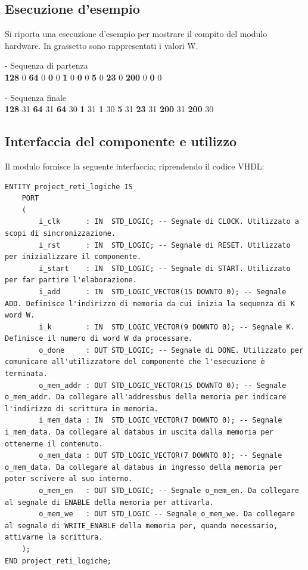 \documentclass[a4paper]{article}
\begin{document}
\subsection{Esecuzione d'esempio}
Si riporta una esecuzione d'esempio per mostrare il compito del modulo hardware. In grassetto sono rappresentati i valori W.

- Sequenza di partenza \\
{\bf128}  0  {\bf64}  0  {\bf0}  0 {\bf1}  0  {\bf0}  0  {\bf5}  0  {\bf23}  0  {\bf200}  0  {\bf0}  0 

- Sequenza finale \\
{\bf128} 31 {\bf64} 31 {\bf64} 30 {\bf1} 31 {\bf1} 30 {\bf5} 31 {\bf23} 31 {\bf200} 31 {\bf200} 30

\subsection{Interfaccia del componente e utilizzo}
Il modulo fornisce la seguente interfaccia; riprendendo il codice VHDL:

\begin{verbatim}
ENTITY project_reti_logiche IS
	PORT
	(
		i_clk      : IN  STD_LOGIC; -- Segnale di CLOCK. Utilizzato a scopi di sincronizzazione.
		i_rst      : IN  STD_LOGIC; -- Segnale di RESET. Utilizzato per inizializzare il componente.
		i_start    : IN  STD_LOGIC; -- Segnale di START. Utilizzato per far partire l'elaborazione.
		i_add      : IN  STD_LOGIC_VECTOR(15 DOWNTO 0); -- Segnale ADD. Definisce l'indirizzo di memoria da cui inizia la sequenza di K word W. 
		i_k        : IN  STD_LOGIC_VECTOR(9 DOWNTO 0); -- Segnale K. Definisce il numero di word W da processare.
		o_done     : OUT STD_LOGIC; -- Segnale di DONE. Utilizzato per comunicare all'utilizzatore del componente che l'esecuzione è terminata.
		o_mem_addr : OUT STD_LOGIC_VECTOR(15 DOWNTO 0); -- Segnale o_mem_addr. Da collegare all'addressbus della memoria per indicare l'indirizzo di scrittura in memoria.
		i_mem_data : IN  STD_LOGIC_VECTOR(7 DOWNTO 0); -- Segnale i_mem_data. Da collegare al databus in uscita dalla memoria per ottenerne il contenuto.
		o_mem_data : OUT STD_LOGIC_VECTOR(7 DOWNTO 0); -- Segnale o_mem_data. Da collegare al databus in ingresso della memoria per poter scrivere al suo interno.
		o_mem_en   : OUT STD_LOGIC; -- Segnale o_mem_en. Da collegare al segnale di ENABLE della memoria per attivarla.
		o_mem_we   : OUT STD_LOGIC -- Segnale o_mem_we. Da collegare al segnale di WRITE_ENABLE della memoria per, quando necessario, attivarne la scrittura.
	);
END project_reti_logiche;
\end{verbatim}
\end{document}
